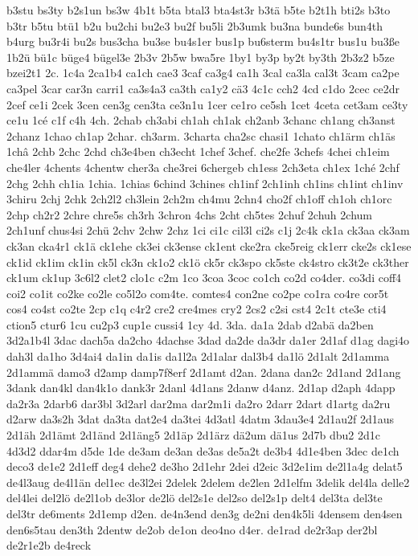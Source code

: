 {b3stu
bs3ty
b2s1un
bs3w
4b1t
b5ta
btal3
bta4st3r
b3tä
b5te
b2t1h
bti2s
b3to
b3tr
b5tu
btü1
b2u
bu2chi
bu2e3
bu2f
bu5li
2b3umk
bu3na
bunde6s
bun4th
b4urg
bu3r4i
bu2s
bus3cha
bu3se
bu4s1er
bus1p
bu6sterm
bu4s1tr
bus1u
bu3ße
1b2ü
bü1c
büge4
bügel3e
2b3v
2b5w
bwa5re
1by1
by3p
by2t
by3th
2b3z2
b5ze
bzei2t1
2c.
1c4a
2ca1b4
ca1ch
cae3
3caf
ca3g4
ca1h
3cal
ca3la
cal3t
3cam
ca2pe
ca3pel
3car
car3n
carri1
ca3s4a3
ca3th
ca1y2
cä3
4c1c
cch2
4cd
c1do
2cec
ce2dr
2cef
ce1i
2cek
3cen
cen3g
cen3ta
ce3n1u
1cer
ce1ro
ce5sh
1cet
4ceta
cet3am
ce3ty
ce1u
1cé
c1f
c4h
4ch.
2chab
ch3abi
ch1ah
ch1ak
ch2anb
3chanc
ch1ang
ch3anst
2chanz
1chao
ch1ap
2char.
ch3arm.
3charta
cha2sc
chasi1
1chato
ch1ärm
ch1äs
1châ
2chb
2chc
2chd
ch3e4ben
ch3echt
1chef
3chef.
che2fe
3chefs
4chei
ch1eim
che4ler
4chents
4chentw
cher3a
che3rei
6chergeb
ch1ess
2ch3eta
ch1ex
1ché
2chf
2chg
2chh
ch1ia
1chia.
1chias
6chind
3chines
ch1inf
2ch1inh
ch1ins
ch1int
ch1inv
3chiru
2chj
2chk
2ch2l2
ch3lein
2ch2m
ch4mu
2chn4
cho2f
ch1off
ch1oh
ch1orc
2chp
ch2r2
2chre
chre5s
ch3rh
3chron
4chs
2cht
ch5tes
2chuf
2chuh
2chum
2ch1unf
chus4si
2chü
2chv
2chw
2chz
1ci
ci1c
cil3l
ci2s
c1j
2c4k
ck1a
ck3aa
ck3am
ck3an
cka4r1
ck1ä
ck1ehe
ck3ei
ck3ense
ck1ent
cke2ra
cke5reig
ck1err
cke2s
ck1ese
ck1id
ck1im
ck1in
ck5l
ck3n
ck1o2
ck1ö
ck5r
ck3spo
ck5ste
ck4stro
ck3t2e
ck3ther
ck1um
ck1up
3c6l2
clet2
clo1c
c2m
1co
3coa
3coc
co1ch
co2d
co4der.
co3di
coff4
coi2
co1it
co2ke
co2le
co5l2o
com4te.
comtes4
con2ne
co2pe
co1ra
co4re
cor5t
cos4
co4st
co2te
2cp
c1q
c4r2
cre2
cre4mes
cry2
2cs2
c2si
cst4
2c1t
cte3e
cti4
ction5
ctur6
1cu
cu2p3
cup1e
cussi4
1cy
4d.
3da.
da1a
2dab
d2abä
da2ben
3d2a1b4l
3dac
dach5a
da2cho
4dachse
3dad
da2de
da3dr
da1er
2d1af
d1ag
dagi4o
dah3l
da1ho
3d4ai4
da1in
da1is
da1l2a
2d1alar
dal3b4
da1lö
2d1alt
2d1amma
2d1ammä
damo3
d2amp
damp7f8erf
2d1amt
d2an.
2dana
dan2c
2d1and
2d1ang
3dank
dan4kl
dan4k1o
dank3r
2danl
4d1ans
2danw
d4anz.
2d1ap
d2aph
4dapp
da2r3a
2darb6
dar3bl
3d2arl
dar2ma
dar2m1i
da2ro
2darr
2dart
d1artg
da2ru
d2arw
da3s2h
3dat
da3ta
dat2e4
da3tei
4d3atl
4datm
3dau3e4
2d1au2f
2d1aus
2d1äh
2d1ämt
2d1änd
2d1äng5
2d1äp
2d1ärz
dä2um
dä1us
2d7b
dbu2
2d1c
4d3d2
ddar4m
d5de
1de
de3am
de3an
de3as
de5a2t
de3b4
4d1e4ben
3dec
de1ch
deco3
de1e2
2d1eff
deg4
dehe2
de3ho
2d1ehr
2dei
d2eic
3d2e1im
de2l1a4g
delat5
de4l3aug
de4l1än
del1ec
de3l2ei
2delek
2delem
de2len
2d1elfm
3delik
del4la
delle2
del4lei
del2lö
de2l1ob
de3lor
de2lö
del2s1e
del2so
del2s1p
delt4
del3ta
del3te
del3tr
de6ments
2d1emp
d2en.
de4n3end
den3g
de2ni
den4k5li
4densem
den4sen
den6s5tau
den3th
2dentw
de2ob
de1on
deo4no
d4er.
de1rad
de2r3ap
der2bl
de2r1e2b
de4reck
}
